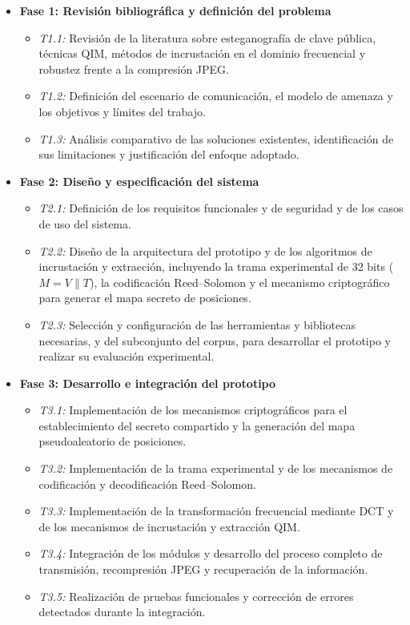 \documentclass[IB]{TFUOC}%
\begin{document}
\begin{itemize}
    \item \textbf{Fase 1: Revisión bibliográfica y definición del problema}
    \begin{itemize}
        \item \textit{T1.1:} Revisión de la literatura sobre esteganografía de clave pública, técnicas QIM, métodos de incrustación en el dominio frecuencial y robustez frente a la compresión JPEG.
        \item \textit{T1.2:} Definición del escenario de comunicación, el modelo de amenaza y los objetivos y límites del trabajo.
        \item \textit{T1.3:} Análisis comparativo de las soluciones existentes, identificación de sus limitaciones y justificación del enfoque adoptado.
    \end{itemize}

    \item \textbf{Fase 2: Diseño y especificación del sistema}
    \begin{itemize}
        \item \textit{T2.1:} Definición de los requisitos funcionales y de seguridad y de los casos de uso del sistema.
        \item \textit{T2.2:} Diseño de la arquitectura del prototipo y de los algoritmos de incrustación y extracción, incluyendo la trama experimental de 32 bits ($M = V \parallel T$), la codificación Reed--Solomon y el mecanismo criptográfico para generar el mapa secreto de posiciones.
        \item \textit{T2.3:} Selección y configuración de las herramientas y bibliotecas necesarias, y del subconjunto del corpus, para desarrollar el prototipo y realizar su evaluación experimental.
    \end{itemize}

    \item \textbf{Fase 3: Desarrollo e integración del prototipo}
    \begin{itemize}
        \item \textit{T3.1:} Implementación de los mecanismos criptográficos para el establecimiento del secreto compartido y la generación del mapa pseudoaleatorio de posiciones.
        \item \textit{T3.2:} Implementación de la trama experimental y de los mecanismos de codificación y decodificación Reed--Solomon.
        \item \textit{T3.3:} Implementación de la transformación frecuencial mediante DCT y de los mecanismos de incrustación y extracción QIM.
        \item \textit{T3.4:} Integración de los módulos y desarrollo del proceso completo de transmisión, recompresión JPEG y recuperación de la información.
        \item \textit{T3.5:} Realización de pruebas funcionales y corrección de errores detectados durante la integración.
    \end{itemize}


\end{itemize}
\end{document}
